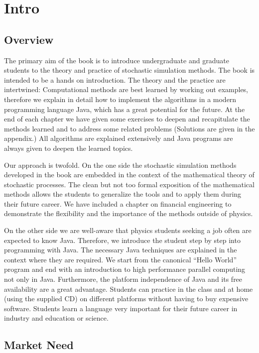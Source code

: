 \documentclass[a4paper]{book}
\begin{document}
\chapter*{Intro}

\section*{Overview}

The primary aim of the book is to introduce undergraduate and graduate 
students to the theory and practice of stochastic simulation methods.
The book is intended to be a  hands on introduction. 
The theory and the practice are intertwined:  Computational methods are 
best learned by working out examples, therefore we explain in detail how to 
implement the algorithms in a modern programming language Java, which has 
a great 
potential for the future. At the end of each chapter we have given
some exercises to deepen and recapitulate the methods learned and to
address some related problems (Solutions are given in the appendix.)
All algorithms are explained extensively and 
Java programs are always given to deepen the learned topics.

Our approach is twofold. On the one side the  stochastic simulation
methods developed in the book are embedded in the context of the
mathematical theory of stochastic processes. The clean but not too formal 
exposition of the mathematical methods allows
the students to generalize the tools and to apply them during their future 
career. We have included a chapter on financial engineering to
demonstrate the flexibility and the importance of the methods outside of
physics. 

On the other side we are well-aware that physics students seeking a
job often are expected to know Java.  Therefore, we introduce the
student step by step into programming with Java. The necessary Java
techniques are explained in the context where they are required.
We start from the canonical ``Hello World'' program and end with an 
introduction to high performance parallel computing not only in Java.
Furthermore, the platform independence of Java and its free
availability are  a great advantage. Students can practice in the class 
and at home (using the supplied CD) on 
different platforms without having to buy expensive
software. Students learn a language very important for 
their future career in industry and education or science.



\section*{Market Need}
\end{document}
